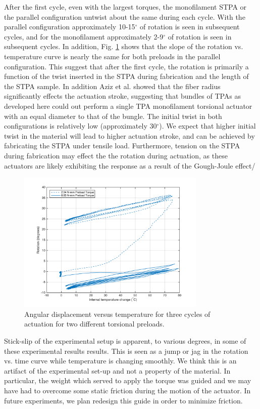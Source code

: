 \documentclass[twocolumn,10pt]{asme2e}
\begin{document}
After the first cycle, even with the largest torques, the monofilament STPA or the parallel configuration untwist about the same during each cycle.  
With the parallel configuration approximately 10-15$^\circ$ of rotation is seen in subsequent cycles, and for the monofilament approximately 2-9$^\circ$ of rotation is seen in subsequent cycles. In addition, Fig. \ref{fig:rot_time_p} shows that the slope of the rotation vs. temperature curve is nearly the same for both preloads in the parallel configuration. This suggest that after the first cycle, the rotation is primarily a function of the twist inserted in the STPA during fabrication and the length of the STPA sample.  In addition Aziz et al. \cite{aziz_controlled} showed that the fiber radius significantly effects the actuation stroke, suggesting that bundles of TPAs as developed here could out perform a single TPA monofilament torsional actuator with an equal diameter to that of the bungle.
The initial twist in both configurations is relatively low (approximately 30$^\circ$).  We expect that higher initial twist in the material will lead to higher actuation stroke, and can be achieved by fabricating the STPA under tensile load. Furthermore, tension on the STPA during fabrication may effect the the rotation during actuation, as these actuators are likely exhibiting the response as a result of the Gough-Joule effect/

\begin{figure}
    \centering
        \includegraphics[width=9cm,clip = true, trim = {1cm, 0 ,0 ,0 }]{../Images/ROT_V_TEMP_100300P.png}
        \caption{Angular displacement versus temperature for three cycles of actuation for two different torsional preloads. }
        \label{fig:rot_time_p}
\end{figure}

Stick-slip of the experimental setup is apparent, to various degrees, in some of these experimental results results. This is seen as a jump or jag in the rotation vs. time curve while temperature is changing smoothly.  We think this is an artifact of the experimental set-up and not a property of the material. In particular, the weight which served to apply the torque was guided and we may have had to overcome some static friction during the motion of the actuator.  In future experiments, we plan redesign this guide in order to minimize friction.  
\end{document}
